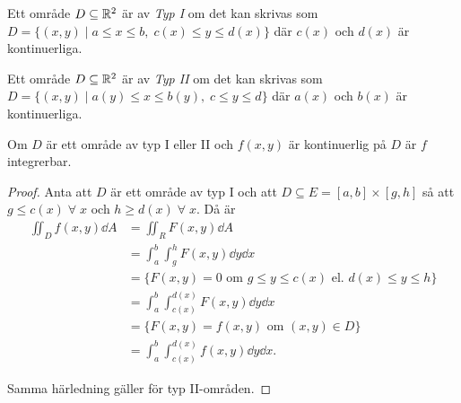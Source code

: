\documentclass[a4paper]{article}
\begin{document}
\providecommand\fname{}
\renewcommand\fname{19-09-25}

\begin{defn}
    Ett område \(
        D \subseteq \mathbb{R}^2
    \) är av \emph{Typ I} om det kan skrivas som \(
        D = \{ (x,y) \; | \; a \leq x \leq b, \; c(x) \leq y \leq d(x) \}
    \) där \(
        c(x)
    \) och \(
        d(x)
    \) är kontinuerliga.
\end{defn}

\begin{defn}
    Ett område \(
        D \subseteq \mathbb{R}^2
    \) är av \emph{Typ II} om det kan skrivas som \(
        D = \{ (x,y) \; | \; a(y) \leq x \leq b(y), \; c \leq y \leq d \}
    \) där \(
        a(x)
    \) och \(
        b(x)
    \) är kontinuerliga.
\end{defn}

\begin{sats}
    Om \(
        D 
    \) är ett område av typ I eller II och \(
        f(x,y)
    \) är kontinuerlig på \(
        D
    \) är \(
        f
    \) integrerbar. 

    \begin{proof}
        Anta att \(
            D
        \) är ett område av typ I och att \(
            D \subseteq E = [a,b] \times [g,h]
        \) så att \(
            g \leq c(x) \; \forall \; x
        \) och \(
            h \geq d(x) \; \forall \; x
        \). Då är 
        \begin{align*}
            \iint_D f(x,y) \dd A &= \iint_R F(x,y) \dd A \\
                &= \int_a^b \int_g^h F(x,y) \dd y \dd x \\
                &= \{ F(x,y) = 0 \text{ om } g \leq y \leq c(x) \text{ el. } d(x) \leq y \leq h \} \\
                &= \int_a^b \int_{c(x)}^{d(x)} F(x,y) \dd y \dd x \\
                &= \{ F(x,y) = f(x,y) \text{ om } (x,y) \in D \} \\
                &= \int_a^b \int_{c(x)}^{d(x)} f(x,y) \dd y \dd x.
        \end{align*}

        Samma härledning gäller för typ II-områden.
    \end{proof}
\end{sats}
\end{document}
